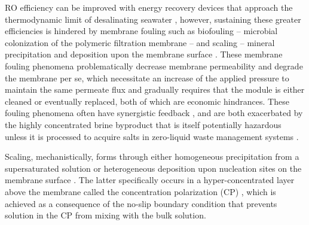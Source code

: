 \documentclass[journal=ACSES&TWater,manuscript=article]{achemso}
\begin{document}
RO efficiency can be improved \cite{Elimelech2011TheEnvironment,Semiat2008EnergyProcesses} with energy recovery devices \cite{Amy2017Membrane-basedProspects} that approach the thermodynamic limit of desalinating seawater \cite{Zarzo2018DesalinationFuture}, however, sustaining these greater efficiencies \cite{Karime2008ROPlant,Hafez2003EconomicsStudy} is hindered by membrane fouling such as biofouling -- microbial colonization of the polymeric filtration membrane \cite{Garcia-Trinanes2021InvestigatingDevice,Radu2010ModelingPassage,Suwarno2014BiofoulingDevelopment} -- and scaling -- mineral precipitation and deposition upon the membrane surface \cite{Warsinger2015ScalingReview,Khan2013SourceSea,Tang2014FoulingPlant,Shmulevsky2017AnalysisMembranes}. These membrane fouling phenomena problematically decrease membrane permeability and degrade the membrane per se, which necessitate an increase of the applied pressure to maintain the same permeate flux and gradually requires that the module is either cleaned or eventually replaced, both of which are economic hindrances. These fouling phenomena often have synergistic feedback \cite{Radu2014ASystems}, and are both exacerbated by the highly concentrated brine byproduct \cite{VanWagner2009EffectPerformance,Belfer1998SurfaceMembranes} that is itself potentially hazardous \cite{Fernandez-torquemada2012DispersionPlants,Clemens1955ToxicityWells,Allen1989ApparatusBrine,Munn1989EffectCrops} unless it is processed to acquire salts \cite{Allen1954ProcessBrine,Fenton1992DesalinationWells} in zero-liquid waste management systems \cite{Jeppesen2009MetalConcentrate,Mavukkandy2019BrineGeneration}. 

Scaling, mechanistically, forms through either homogeneous precipitation from a supersaturated solution or heterogeneous deposition upon nucleation sites on the membrane surface \cite{Karabelas2014IncipientChannels,Warsinger2018InorganicOsmosis}. The latter specifically occurs in a hyper-concentrated layer above the membrane called the concentration polarization (CP)   \cite{McCutcheon2006InfluenceOsmosis,Murthy1997EstimationModel,Gruber2011ComputationalSystems,Sablani2001ConcentrationReview,Zydney1997StagnantSystems}, which is achieved as a consequence of the no-slip boundary condition that prevents solution in the CP from mixing with the bulk solution. 
\end{document}
